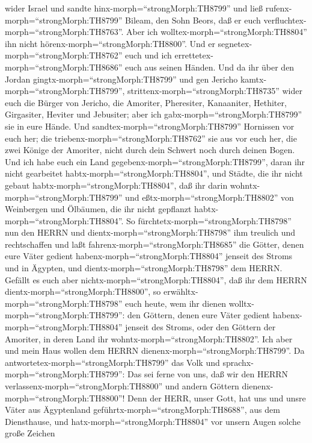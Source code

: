 wider Israel und sandte hinx-morph=``strongMorph:TH8799'' und ließ
rufenx-morph=``strongMorph:TH8799'' Bileam, den Sohn Beors, daß er euch
verfluchtex-morph=``strongMorph:TH8763''.  Aber ich
wolltex-morph=``strongMorph:TH8804'' ihn nicht
hörenx-morph=``strongMorph:TH8800''. Und er
segnetex-morph=``strongMorph:TH8762'' euch und ich
errettetex-morph=``strongMorph:TH8686'' euch aus seinen Händen.
 Und da ihr über den Jordan
gingtx-morph=``strongMorph:TH8799'' und gen Jericho
kamtx-morph=``strongMorph:TH8799'',
strittenx-morph=``strongMorph:TH8735'' wider euch die Bürger von
Jericho, die Amoriter, Pheresiter, Kanaaniter, Hethiter, Girgasiter,
Heviter und Jebusiter; aber ich gabx-morph=``strongMorph:TH8799'' sie in
eure Hände.  Und sandtex-morph=``strongMorph:TH8799''
Hornissen vor euch her; die triebenx-morph=``strongMorph:TH8762'' sie
aus vor euch her, die zwei Könige der Amoriter, nicht durch dein Schwert
noch durch deinen Bogen.  Und ich habe euch ein Land
gegebenx-morph=``strongMorph:TH8799'', daran ihr nicht gearbeitet
habtx-morph=``strongMorph:TH8804'', und Städte, die ihr nicht gebaut
habtx-morph=``strongMorph:TH8804'', daß ihr darin
wohntx-morph=``strongMorph:TH8799'' und
eßtx-morph=``strongMorph:TH8802'' von Weinbergen und Ölbäumen, die ihr
nicht gepflanzt habtx-morph=``strongMorph:TH8804''.  So
fürchtetx-morph=``strongMorph:TH8798'' nun den HERRN und
dientx-morph=``strongMorph:TH8798'' ihm treulich und rechtschaffen und
laßt fahrenx-morph=``strongMorph:TH8685'' die Götter, denen eure Väter
gedient habenx-morph=``strongMorph:TH8804'' jenseit des Stroms und in
Ägypten, und dientx-morph=``strongMorph:TH8798'' dem HERRN.
 Gefällt es euch aber nichtx-morph=``strongMorph:TH8804'',
daß ihr dem HERRN dientx-morph=``strongMorph:TH8800'', so
erwähltx-morph=``strongMorph:TH8798'' euch heute, wem ihr dienen
wolltx-morph=``strongMorph:TH8799'': den Göttern, denen eure Väter
gedient habenx-morph=``strongMorph:TH8804'' jenseit des Stroms, oder den
Göttern der Amoriter, in deren Land ihr
wohntx-morph=``strongMorph:TH8802''. Ich aber und mein Haus wollen dem
HERRN dienenx-morph=``strongMorph:TH8799''.  Da
antwortetex-morph=``strongMorph:TH8799'' das Volk und
sprachx-morph=``strongMorph:TH8799'': Das sei ferne von uns, daß wir den
HERRN verlassenx-morph=``strongMorph:TH8800'' und andern Göttern
dienenx-morph=``strongMorph:TH8800''!  Denn der HERR, unser
Gott, hat uns und unsre Väter aus Ägyptenland
geführtx-morph=``strongMorph:TH8688'', aus dem Diensthause, und
hatx-morph=``strongMorph:TH8804'' vor unsern Augen solche große Zeichen
